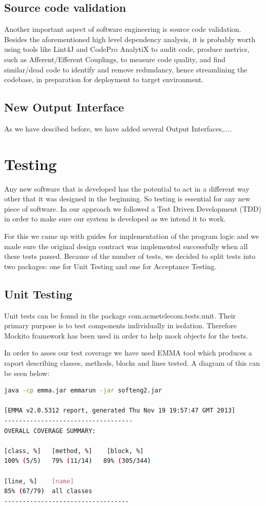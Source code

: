 \documentclass[11pt,twocolumn]{article} %
\begin{document}
\subsection{Source code validation}
Another important aspect of software engineering is source code validation. Besides the
aforementioned high level dependency analysis, it is probably worth using tools like Lint4J
and CodePro AnalytiX to audit code, produce metrics, such as Afferent/Efferent Couplings, to measure code quality, and find similar/dead code to identify and remove redundancy, hence streamlining the codebase, in preparation for deployment to target environment.


\subsection{New Output Interface}
As we have descibed before, we have added several Output Interfaces,....

\section{Testing}
Any new software that is developed has the potential to act in a different way other that it was designed in the beginning. So testing is essential for any new piece of software.
In our approach we followed a Test Driven Development (TDD) in order to make sure our system is developed as we intend it to work. 

For this we came up with guides for implementation of the program logic and we made sure the original design contract was implemented successfully when all these tests passed.            
Because of the number of tests, we decided to split tests into two packages: one for Unit Testing and one for Acceptance Testing.


\subsection{Unit Testing}
Unit tests can be found in the package com.acmetelecom.tests.unit. Their primary purpose is to test components individually in isolation. Therefore Mockito\cite{mockito} framework has been used in order to help mock objects for the tests.

In order to asses our test coverage we have used EMMA tool which produces a raport describing classes, methods, blocks and lines tested. A diagram of this can be seen below:

\begin{lstlisting}[language=bash]
java -cp emma.jar emmarun -jar softeng2.jar

[EMMA v2.0.5312 report, generated Thu Nov 19 19:57:47 GMT 2013]
-----------------------------------
OVERALL COVERAGE SUMMARY:

[class, %]   [method, %]    [block, %]   
100% (5/5)   79% (11/14)   89% (305/344) 

[line, %]    [name]
85% (67/79)  all classes
----------------------------------
\end{lstlisting}
\end{document}
